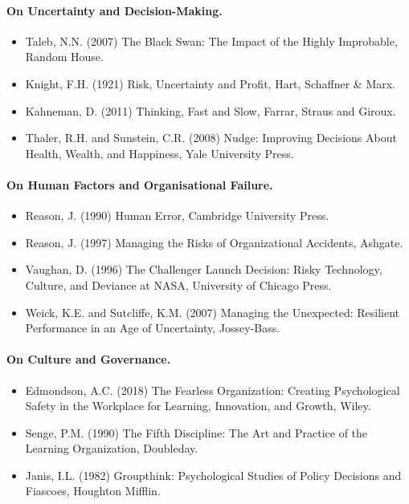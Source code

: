 \paragraph{\textbf{On Uncertainty and Decision-Making}.}
\begin{itemize}
  \item{Taleb, N.N. (2007) The Black Swan: The Impact of the Highly Improbable, Random House.}
  \item{Knight, F.H. (1921) Risk, Uncertainty and Profit, Hart, Schaffner \& Marx.}
  \item{Kahneman, D. (2011) Thinking, Fast and Slow, Farrar, Straus and Giroux.}
  \item{Thaler, R.H. and Sunstein, C.R. (2008) Nudge: Improving Decisions About Health, Wealth, and Happiness, Yale University Press.}
\end{itemize}

\paragraph{\textbf{On Human Factors and Organisational Failure}.}
\begin{itemize}
  \item{Reason, J. (1990) Human Error, Cambridge University Press.}
  \item{Reason, J. (1997) Managing the Risks of Organizational Accidents, Ashgate.}
  \item{Vaughan, D. (1996) The Challenger Launch Decision: Risky Technology, Culture, and Deviance at NASA, University of Chicago Press.}
  \item{Weick, K.E. and Sutcliffe, K.M. (2007) Managing the Unexpected: Resilient Performance in an Age of Uncertainty, Jossey-Bass.}
\end{itemize}

\paragraph{\textbf{On Culture and Governance}.}
\begin{itemize}
  \item{Edmondson, A.C. (2018) The Fearless Organization: Creating Psychological Safety in the Workplace for Learning, Innovation, and Growth, Wiley.}
  \item{Senge, P.M. (1990) The Fifth Discipline: The Art and Practice of the Learning Organization, Doubleday.}
  \item{Janis, I.L. (1982) Groupthink: Psychological Studies of Policy Decisions and Fiascoes, Houghton Mifflin.}
\end{itemize}

